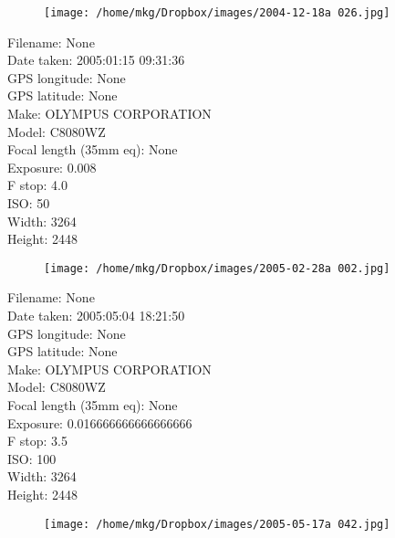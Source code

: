 \clearpage
\recalctypearea
\newpage
\noindent
\begin{figure}
    \texttt{[image: /home/mkg/Dropbox/images/2004-12-18a 026.jpg]}
    \captionlistentry[figure]{\url{\protect\detokenize{}}}
\end{figure}

\clearpage
\recalctypearea
\newpage
\noindent
Filename: None\\ 
Date taken: 2005:01:15 09:31:36\\ 
GPS longitude: None\\ 
GPS latitude: None\\ 
Make: OLYMPUS CORPORATION\\ 
Model: C8080WZ\\ 
Focal length (35mm eq): None\\ 
Exposure: 0.008\\ 
F stop: 4.0\\ 
ISO: 50\\ 
Width: 3264\\ 
Height: 2448\\ 

\clearpage
\recalctypearea
\newpage
\noindent
\begin{figure}
    \texttt{[image: /home/mkg/Dropbox/images/2005-02-28a 002.jpg]}
\end{figure}

\clearpage
\recalctypearea
\newpage
\noindent
Filename: None\\ 
Date taken: 2005:05:04 18:21:50\\ 
GPS longitude: None\\ 
GPS latitude: None\\ 
Make: OLYMPUS CORPORATION\\ 
Model: C8080WZ\\ 
Focal length (35mm eq): None\\ 
Exposure: 0.016666666666666666\\ 
F stop: 3.5\\ 
ISO: 100\\ 
Width: 3264\\ 
Height: 2448\\ 

\clearpage
\recalctypearea
\newpage
\noindent
\begin{figure}
    \texttt{[image: /home/mkg/Dropbox/images/2005-05-17a 042.jpg]}
    \captionlistentry[figure]{\url{\protect\detokenize{}}}
\end{figure}

